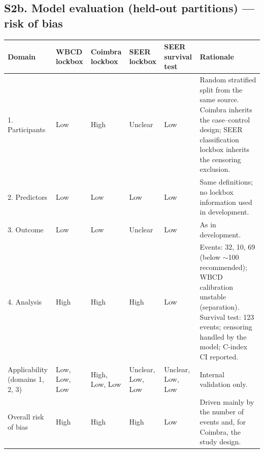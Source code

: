 \documentclass[10pt,a4paper]{article}
\begin{document}
\subsection*{S2b. Model evaluation (held-out partitions) --- risk of bias}
{\small
\begin{tabularx}{\textwidth}{@{}P{3.0cm}P{1.3cm}P{1.3cm}P{1.3cm}P{1.4cm}Y@{}}
\toprule
\textbf{Domain} & \textbf{WBCD lock\-box} & \textbf{Coimbra lock\-box} & \textbf{SEER lock\-box} & \textbf{SEER survival test} & \textbf{Rationale}\\
. Participants & Low & High & Unclear & Low & Random stratified split from the same source. Coimbra inherits the case--control design; SEER classification lockbox inherits the censoring exclusion.\\
2. Predictors & Low & Low & Low & Low & Same definitions; no lockbox information used in development.\\
3. Outcome & Low & Low & Unclear & Low & As in development.\\
4. Analysis & High & High & High & Low & Events: 32, 10, 69 (below $\sim$100 recommended); WBCD calibration unstable (separation). Survival test: 123 events; censoring handled by the model; C-index CI reported.\\
Applicability (domains 1, 2, 3) & Low, Low, Low & High, Low, Low & Unclear, Low, Low & Unclear, Low, Low & Internal validation only.\\
\midrule
Overall risk of bias & High & High & High & Low & Driven mainly by the number of events and, for Coimbra, the study design.\\
\bottomrule
\end{tabularx}
}

\newpage
\end{document}

